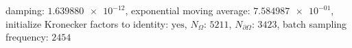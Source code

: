 damping: $\num[scientific-notation=true]{1.639880e-12}$, exponential moving average: $\num[scientific-notation=true]{7.584987e-01}$, initialize Kronecker factors to identity: $\text{yes}$, $N_{\Omega}$: $\num[scientific-notation=false]{5211}$, $N_{\partial\Omega}$: $\num[scientific-notation=false]{3423}$, batch sampling frequency: $\num[scientific-notation=false]{2454}$